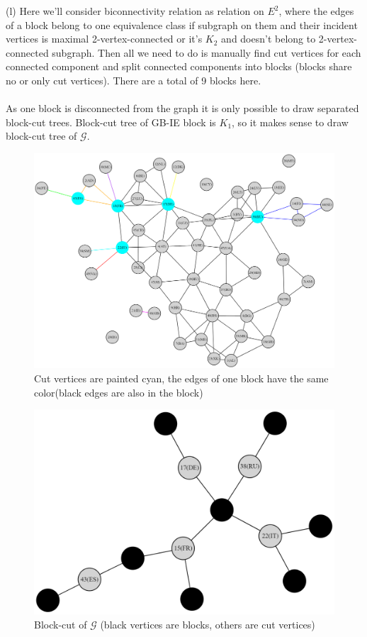 \documentclass{article}
\begin{document}
	\newpage
	(l) Here we'll consider biconnectivity relation as relation on $E^2$, where the edges of a block belong to one equivalence class if subgraph on them and their incident vertices is maximal 2-vertex-connected or it's $K_2$ and doesn't belong to 2-vertex-connected subgraph. Then all we need to do is manually find cut vertices for each connected component and split connected components into blocks (blocks share no or only cut vertices). There are a total of 9 blocks here. \\\\
	As one block is disconnected from the graph it is only possible to draw separated block-cut trees. Block-cut tree of GB-IE block is $K_1$, so it makes sense to draw block-cut tree of $\mathcal{G}$.
	\begin{figure}[h]
		\centering
		\includegraphics[width=1\textwidth]{blocks.png}
		\caption{Cut vertices are painted cyan, the edges of one block have the same color(black edges are also in the block)}
	\end{figure}\newpage
	\begin{figure}[h]
	\centering
	\includegraphics[width=1\textwidth]{block cut tree.png}
	\caption{Block-cut of $\mathcal{G}$ (black vertices are blocks, others are cut 	vertices)}
	\end{figure}
\end{document}
